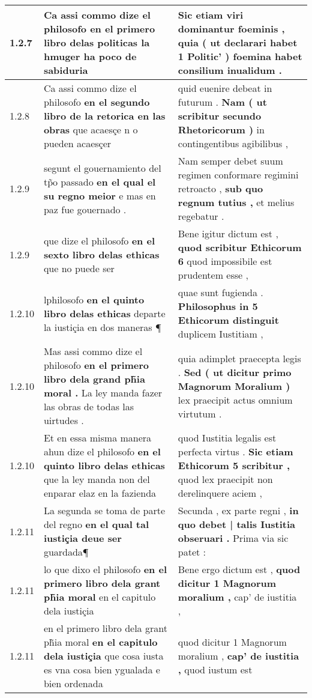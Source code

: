 \begin{tabular}{|p{1cm}|p{6.5cm}|p{6.5cm}|}
1.2.7 & Ca assi commo dize el philosofo \textbf{ en el primero libro delas politicas } la hmuger ha poco de sabiduria & Sic etiam viri dominantur foeminis , \textbf{ quia ( ut declarari habet 1 Politic’ ) } foemina habet consilium inualidum . \\\hline
1.2.8 & Ca assi commo dize el philosofo \textbf{ en el segundo libro de la retorica en las obras } que acaesçe n o pueden acaesçer & quid euenire debeat in futurum . \textbf{ Nam ( ut scribitur secundo Rhetoricorum ) } in contingentibus agibilibus , \\\hline
1.2.9 & segunt el gouernamiento del tp̃o passado \textbf{ en el qual el su regno meior } e mas en paz fue gouernado . & Nam semper debet suum regimen conformare regimini retroacto , \textbf{ sub quo regnum tutius , } et melius regebatur . \\\hline
1.2.9 & que dize el philosofo \textbf{ en el sexto libro delas ethicas } que no puede ser & Bene igitur dictum est , \textbf{ quod scribitur Ethicorum 6 } quod impossibile est prudentem esse , \\\hline
1.2.10 & lphilosofo \textbf{ en el quinto libro delas ethicas } departe la iustiçia en dos maneras ¶ & quae sunt fugienda . \textbf{ Philosophus in 5 Ethicorum distinguit } duplicem Iustitiam , \\\hline
1.2.10 & Mas assi commo dize el philosofo \textbf{ en el primero libro dela grand ph̃ia moral . } La ley manda fazer las obras de todas las uirtudes . & quia adimplet praecepta legis . \textbf{ Sed ( ut dicitur primo Magnorum Moralium ) } lex praecipit actus omnium virtutum . \\\hline
1.2.10 & Et en essa misma manera ahun dize el philosofo \textbf{ en el quinto libro delas ethicas } que la ley manda non del enparar elaz en la fazienda & quod Iustitia legalis est perfecta virtus . \textbf{ Sic etiam Ethicorum 5 scribitur , } quod lex praecipit non derelinquere aciem , \\\hline
1.2.11 & La segunda se toma de parte del regno \textbf{ en el qual tal iustiçia deue ser } guardada¶ & Secunda , ex parte regni , \textbf{ in quo debet | talis Iustitia obseruari . } Prima via sic patet : \\\hline
1.2.11 & lo que dixo el philosofo \textbf{ en el primero libro dela grant ph̃ia moral } en el capitulo dela iustiçia & Bene ergo dictum est , \textbf{ quod dicitur 1 Magnorum moralium , } cap’ de iustitia , \\\hline
1.2.11 & en el primero libro dela grant ph̃ia moral \textbf{ en el capitulo dela iustiçia } que cosa iusta es vna cosa bien ygualada e bien ordenada & quod dicitur 1 Magnorum moralium , \textbf{ cap’ de iustitia , } quod iustum est \\\hline

\end{tabular}
